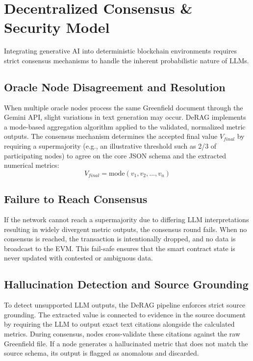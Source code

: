 \documentclass[11pt,a4paper]{article}
\begin{document}
\section{Decentralized Consensus \& Security Model}
Integrating generative AI into deterministic blockchain environments requires strict consensus mechanisms to handle the inherent probabilistic nature of LLMs.

\subsection{Oracle Node Disagreement and Resolution}
When multiple oracle nodes process the same Greenfield document through the Gemini API, slight variations in text generation may occur. DeRAG implements a mode-based aggregation algorithm applied to the validated, normalized metric outputs. The consensus mechanism determines the accepted final value $V_{final}$ by requiring a supermajority (e.g., an illustrative threshold such as 2/3 of participating nodes) to agree on the core JSON schema and the extracted numerical metrics:
\begin{equation}
    V_{final} = \text{mode}(v_1, v_2, ..., v_n)
\end{equation}

\subsection{Failure to Reach Consensus}
If the network cannot reach a supermajority due to differing LLM interpretations resulting in widely divergent metric outputs, the consensus round fails. When no consensus is reached, the transaction is intentionally dropped, and no data is broadcast to the EVM. This fail-safe ensures that the smart contract state is never updated with contested or ambiguous data.

\subsection{Hallucination Detection and Source Grounding}
To detect unsupported LLM outputs, the DeRAG pipeline enforces strict source grounding. The extracted value is connected to evidence in the source document by requiring the LLM to output exact text citations alongside the calculated metrics. During consensus, nodes cross-validate these citations against the raw Greenfield file. If a node generates a hallucinated metric that does not match the source schema, its output is flagged as anomalous and discarded.
\end{document}
